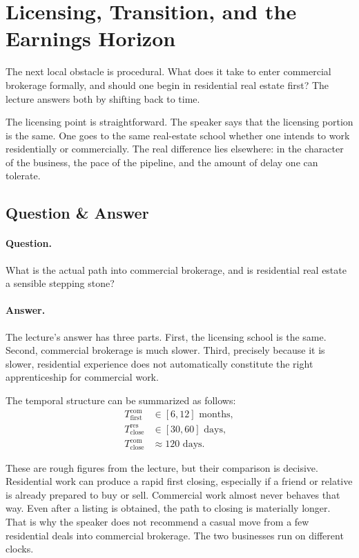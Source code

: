 \section{Licensing, Transition, and the Earnings Horizon}

The next local obstacle is procedural. What does it take to enter commercial brokerage formally, and should one begin in residential real estate first? The lecture answers both by shifting back to time.

The licensing point is straightforward. The speaker says that the licensing portion is the same. One goes to the same real-estate school whether one intends to work residentially or commercially. The real difference lies elsewhere: in the character of the business, the pace of the pipeline, and the amount of delay one can tolerate.

\subsection{Question \& Answer}

\paragraph{Question.}
What is the actual path into commercial brokerage, and is residential real estate a sensible stepping stone?

\paragraph{Answer.}
The lecture's answer has three parts. First, the licensing school is the same. Second, commercial brokerage is much slower. Third, precisely because it is slower, residential experience does not automatically constitute the right apprenticeship for commercial work.

The temporal structure can be summarized as follows:
\begin{align}
T_{\text{first}}^{\text{com}} &\in [6,12]\text{ months}, \\
T_{\text{close}}^{\text{res}} &\in [30,60]\text{ days}, \\
T_{\text{close}}^{\text{com}} &\approx 120\text{ days}.
\end{align}

These are rough figures from the lecture, but their comparison is decisive. Residential work can produce a rapid first closing, especially if a friend or relative is already prepared to buy or sell. Commercial work almost never behaves that way. Even after a listing is obtained, the path to closing is materially longer. That is why the speaker does not recommend a casual move from a few residential deals into commercial brokerage. The two businesses run on different clocks.

